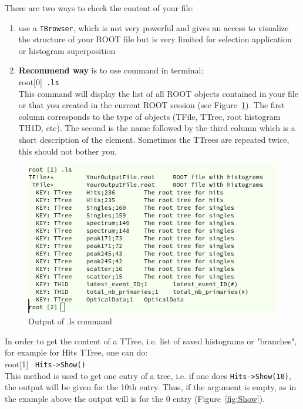 \documentclass[12pt]{article}
\begin{document}
There are two ways to check the content of your file:
\begin{enumerate}
\item use a \verb|TBrowser|, which is not very powerful and gives an access to visualize the structure of your ROOT file but is very limited for selection application or histogram superposition
\item \textbf{Recommend way} is to use command in terminal:\\

root[0]\verb| .ls|\\

This command will display the list of all ROOT objects contained in your file or that you created in the current ROOT session (see Figure~\ref{fig:.ls}). The first column corresponds to the type of objects (TFile, TTree, root histogram TH1D, etc). The second is the name followed by the third column which is a short description of the element. Sometimes the TTrees are repeated twice, this should not bother you. 
\end{enumerate}
\begin{figure}[h]
\centering
\includegraphics[scale=0.5]{figs/ls.png}
\caption{Output of .ls command}
\label{fig:.ls}
\end{figure}
\clearpage
In order to get the content of a TTree, i.e. list of saved histograms
or "branches", for example for Hits TTree, one can do:\\

root[1] \verb| Hits->Show()| \\

This method is used to get one entry of a tree, i.e. if one does \verb|Hits->Show(10)|,  the output will be given for the 10th entry. Thus, if the argument is empty, as in the example above the output will is for the 0 entry (Figure~\ref{fig:Show}).
\end{document}
